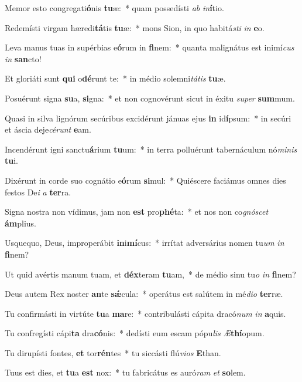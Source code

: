\item Memor esto congregati\textbf{ó}nis \textbf{tu}æ:~* quam possedísti \textit{ab} \textit{in}\textbf{í}tio.
\item Redemísti virgam hæredi\textbf{tá}tis \textbf{tu}æ:~* mons Sion, in quo habitá\hspace*{0.06em}\textit{sti} \textit{in} \textbf{e}o.
\item Leva manus tuas in supérbias e\textbf{ó}rum in \textbf{fi}nem:~* quanta malignátus est inimí\tinyhspace\textit{cus} \textit{in} \textbf{san}cto!
\item Et gloriáti sunt \textbf{qui} o\textbf{dé}runt te:~* in médio solemni\textit{tátis} \textbf{tu}æ.
\item Posuérunt signa \textbf{su}a, \textbf{si}gna:~* et non cognovérunt sicut in éxitu \textit{super} \textbf{sum}mum.
\item Quasi in silva lignórum secúribus excidérunt jánuas ejus \textbf{in} id\textbf{í}psum:~* in secúri et áscia deje\tinyhspace\textit{cérunt} \textbf{e}am.
\item Incendérunt igni sanctu\textbf{á}rium \textbf{tu}um:~* in terra polluérunt tabernáculum nó\textit{minis} \textbf{tu}i.
\item Dixérunt in corde suo cognátio e\textbf{ó}rum \textbf{si}mul:~* Quiéscere faciámus omnes dies festos De\tinyhspace\textit{i} \textit{a} \textbf{ter}ra.
\item Signa nostra non vídimus, jam non \textbf{est} pro\textbf{phé}ta:~* et nos non co\textit{gnóscet} \textbf{ám}plius.
\item Usquequo, Deus, improperábit \textbf{in}i\textbf{mí}cus:~* irrítat adversárius nomen tu\textit{um} \textit{in} \textbf{fi}nem?
\item Ut quid avértis manum tuam, et \textbf{déx}teram \textbf{tu}am,~* de médio sinu tu\textit{o} \textit{in} \textbf{fi}nem?
\item Deus autem Rex noster \textbf{an}te \textbf{sǽ}cula:~* operátus est salútem in mé\tinyhspace\textit{dio} \textbf{ter}ræ.
\item Tu confirmásti in virtúte \textbf{tu}a \textbf{ma}re:~* contribulásti cápita dracó\textit{num} \textit{in} \textbf{a}quis.
\item Tu confregísti cápi\textbf{ta} dra\textbf{có}nis:~* dedísti eum escam pópu\tinyhspace\textit{lis} \textit{Æ}\textbf{thí}opum.
\item Tu dirupísti fontes, \textbf{et} tor\textbf{rén}tes~* tu siccásti flú\textit{vios} \textbf{E}than.
\item Tuus est dies, et \textbf{tu}a \textbf{est} nox:~* tu fabricátus es auró\textit{ram} \textit{et} \textbf{so}lem.
